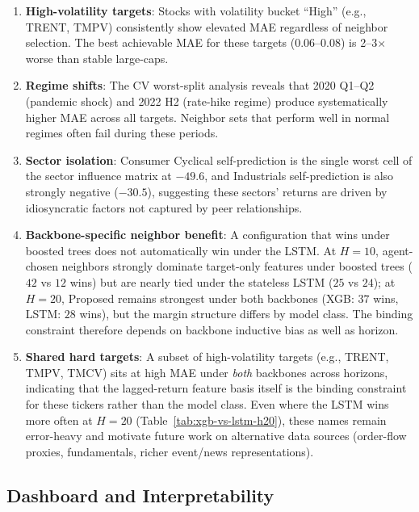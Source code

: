 \documentclass[12pt,a4paper,titlepage]{article}
\begin{document}
\begin{enumerate}
    \item \textbf{High-volatility targets}: Stocks with volatility bucket ``High'' (e.g., TRENT, TMPV) consistently show elevated MAE regardless of neighbor selection. The best achievable MAE for these targets (0.06--0.08) is 2--3$\times$ worse than stable large-caps.
    
    \item \textbf{Regime shifts}: The CV worst-split analysis reveals that 2020 Q1--Q2 (pandemic shock) and 2022 H2 (rate-hike regime) produce systematically higher MAE across all targets. Neighbor sets that perform well in normal regimes often fail during these periods.
    
    \item \textbf{Sector isolation}: Consumer Cyclical self-prediction is the single worst cell of the sector influence matrix at \(-49.6\), and Industrials self-prediction is also strongly negative (\(-30.5\)), suggesting these sectors' returns are driven by idiosyncratic factors not captured by peer relationships.

    \item \textbf{Backbone-specific neighbor benefit}: A configuration that wins under boosted trees does not automatically win under the LSTM. At \(H=10\), agent-chosen neighbors strongly dominate target-only features under boosted trees (\(42\) vs \(12\) wins) but are nearly tied under the stateless LSTM (\(25\) vs \(24\)); at \(H=20\), Proposed remains strongest under both backbones (XGB: \(37\) wins, LSTM: \(28\) wins), but the margin structure differs by model class. The binding constraint therefore depends on backbone inductive bias as well as horizon.

    \item \textbf{Shared hard targets}: A subset of high-volatility targets (e.g., TRENT, TMPV, TMCV) sits at high MAE under \emph{both} backbones across horizons, indicating that the lagged-return feature basis itself is the binding constraint for these tickers rather than the model class. Even where the LSTM wins more often at \(H=20\) (Table~\ref{tab:xgb-vs-lstm-h20}), these names remain error-heavy and motivate future work on alternative data sources (order-flow proxies, fundamentals, richer event/news representations).
\end{enumerate}

\subsection{Dashboard and Interpretability}
\end{document}
